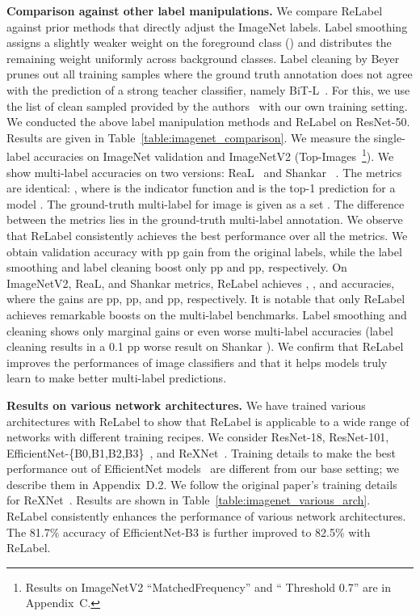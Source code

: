 \documentclass[final]{cvpr}
\newcommand\ours{{{\mbox{ReLabel}}}\xspace}
\begin{document}
\noindent\textbf{Comparison against other label manipulations.}
We compare \ours against prior methods that directly adjust the ImageNet labels. Label smoothing~\cite{szegedy2016rethinking_labelsm} assigns a slightly weaker weight on the foreground class () and distributes the remaining weight  uniformly across background classes.
Label cleaning by Beyer \etal~\cite{beyer2020are_we_done} prunes out all training samples where the ground truth annotation does not agree with the prediction of a strong teacher classifier, namely BiT-L~\cite{kolesnikov2019big}. For this, we use the list of clean sampled provided by the authors~\cite{beyer2020are_we_done} with our own training setting.
We conducted the above label manipulation methods and \ours on ResNet-50. 
Results are given in Table~\ref{table:imagenet_comparison}. 
We measure the single-label accuracies on ImageNet validation and ImageNetV2 ({\small Top-Images}~\cite{recht2019imagenetv2}\footnote{Results on ImageNetV2 ``MatchedFrequency'' and `` Threshold 0.7'' are in Appendix~C.}). We show multi-label accuracies on two versions: ReaL~\cite{beyer2020are_we_done} and Shankar \etal~\cite{shanker2020machine_accuracy}. The metrics are identical: , where  is the indicator function and  is the top-1 prediction for a model . The ground-truth multi-label for image  is given as a set . The difference between the metrics lies in the ground-truth multi-label annotation. 
We observe that \ours consistently achieves the best performance over all the metrics.
We obtain  validation accuracy with  pp gain from the original labels, while the label smoothing and label cleaning boost only  pp and  pp, respectively.
On ImageNetV2, ReaL, and Shankar \etal metrics, \ours achieves , , and  accuracies, where the gains are  pp,  pp, and  pp, respectively.
It is notable that only \ours achieves remarkable boosts on the multi-label benchmarks. Label smoothing and cleaning shows only marginal gains or even worse multi-label accuracies (\eg label cleaning results in a 0.1 pp worse result on Shankar \etal).
We confirm that \ours improves the performances of image classifiers and that it helps models truly learn to make better multi-label predictions.







\noindent\textbf{Results on various network architectures.}
We have trained various architectures with \ours to show that \ours is applicable to a wide range of networks with different training recipes. We consider ResNet-18, ResNet-101, EfficientNet-\{B0,B1,B2,B3\}~\cite{efficientnet}, and ReXNet~\cite{han2020rexnet}.
Training details to make the best performance out of EfficientNet models~\cite{efficientnet} are different from our base setting; we describe them in Appendix~D.2. We follow the original paper's training details for ReXNet~\cite{han2020rexnet}. 
Results are shown in Table~\ref{table:imagenet_various_arch}. \ours consistently enhances the performance of various network architectures. The 81.7\% accuracy of EfficientNet-B3 is further improved to 82.5\% with \ours.
\end{document}
